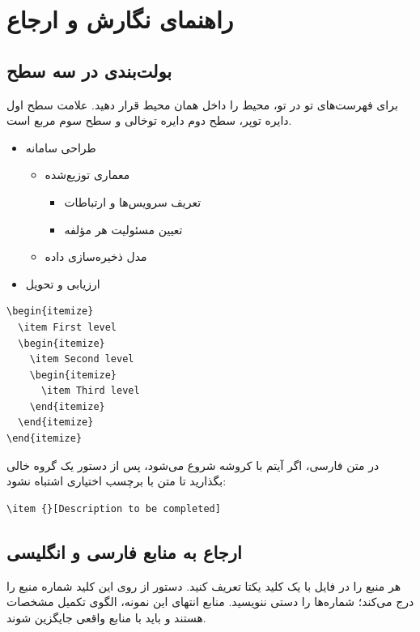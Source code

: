 \chapter{راهنمای نگارش و ارجاع}
\label{chap:usage-guide}
\section{بولت‌بندی در سه سطح}
برای فهرست‌های تو در تو، محیط  را داخل همان محیط قرار دهید. علامت سطح اول دایره توپر، سطح دوم دایره توخالی و سطح سوم مربع است.
\begin{itemize}
  \item طراحی سامانه
  \begin{itemize}
    \item معماری توزیع‌شده
    \begin{itemize}
      \item تعریف سرویس‌ها و ارتباطات
      \item تعیین مسئولیت هر مؤلفه
    \end{itemize}
    \item مدل ذخیره‌سازی داده
  \end{itemize}
  \item ارزیابی و تحویل
\end{itemize}
\begin{latin}
\begin{lstlisting}[style=DSCCode]
\begin{itemize}
  \item First level
  \begin{itemize}
    \item Second level
    \begin{itemize}
      \item Third level
    \end{itemize}
  \end{itemize}
\end{itemize}
\end{lstlisting}
\end{latin}
در متن فارسی، اگر آیتم با کروشه شروع می‌شود، پس از دستور  یک گروه خالی بگذارید تا متن با برچسب اختیاری اشتباه نشود:
\begin{latin}
\begin{lstlisting}[style=DSCCode]
\item {}[Description to be completed]
\end{lstlisting}
\end{latin}

\section{ارجاع به منابع فارسی و انگلیسی}
هر منبع را در فایل  با یک کلید یکتا تعریف کنید. دستور  از روی این کلید شماره منبع را درج می‌کند؛ شماره‌ها را دستی ننویسید. منابع انتهای این نمونه، الگوی تکمیل مشخصات هستند و باید با منابع واقعی جایگزین شوند.

